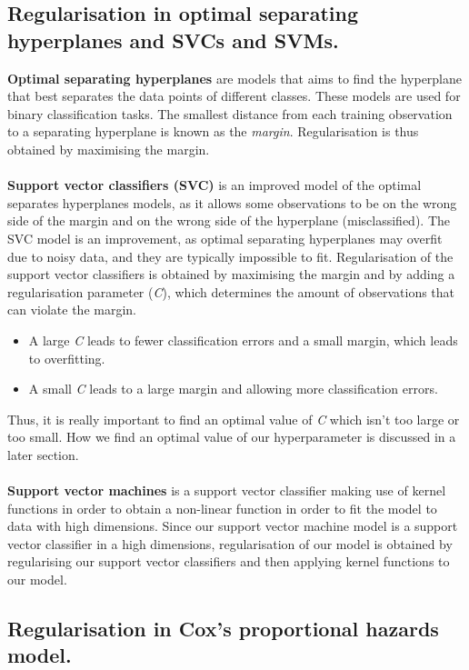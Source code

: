 \documentclass[12pt]{article}
\begin{document}
\subsection*{Regularisation in optimal separating hyperplanes and SVCs and SVMs.}
\textbf{Optimal separating hyperplanes} are models that aims to find the hyperplane that best separates the data points of different classes. These models are used for binary classification tasks.
The smallest distance from each training observation to a separating hyperplane is known as the \textit{margin}. 
Regularisation is thus obtained by maximising the margin. \\ \\
\textbf{Support vector classifiers (SVC)} is an improved model of the optimal separates hyperplanes models, as it allows some observations to be on the
wrong side of the margin and on the wrong side of the hyperplane (misclassified). The SVC model is an improvement, as optimal separating hyperplanes may overfit due to noisy data, and they are typically
impossible to fit. Regularisation of the support vector classifiers is obtained by maximising the margin and by adding a regularisation parameter (\textit{C}), which determines the amount of observations that can violate the margin.
\begin{itemize}
    \item A large \textit{C} leads to fewer classification errors and a small margin, which leads to overfitting.
    \item A small \textit{C} leads to a large margin and allowing more classification errors.
\end{itemize}
Thus, it is really important to find an optimal value of \textit{C} which isn't too large or too small.
How we find an optimal value of our hyperparameter is discussed in a later section.
\\ \\
\textbf{Support vector machines} is a support vector classifier making use of kernel functions in order to obtain a non-linear function in order to fit the model to data with high dimensions.
Since our support vector machine model is a support vector classifier in a high dimensions, regularisation of our model is obtained by regularising our support vector classifiers and then applying kernel functions to our model. 

\subsection*{Regularisation in Cox's proportional hazards model.}
\end{document}
